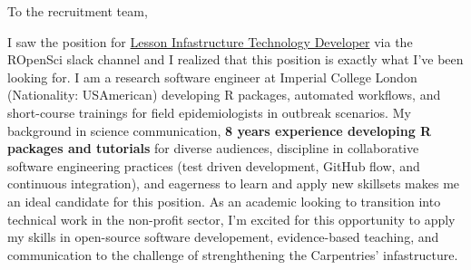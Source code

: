 




\vspace{1ex}
To the recruitment team,

\vspace{1ex}


I saw the position for
\href{https://static.carpentries.org/lesson-infrastructure-technology-developer/}{Lesson
Infastructure Technology Developer} via the ROpenSci slack channel and I
realized that this position is exactly what I've been looking for. I am a
research software engineer at Imperial College London (Nationality: USAmerican)
developing R packages, automated workflows, and short-course trainings for
field epidemiologists in outbreak scenarios. 
My background in science communication, \textbf{8 years experience developing R
packages and tutorials} for diverse audiences, discipline in collaborative
software engineering practices (test driven development, GitHub flow, and
continuous integration), and eagerness to learn and apply new skillsets makes
me an ideal candidate for this position. As an academic looking to transition
into technical work in the non-profit sector, I'm excited for this opportunity
to apply my skills in open-source software developement, evidence-based
teaching, and communication to the challenge of strenghthening the Carpentries'
infastructure. 


